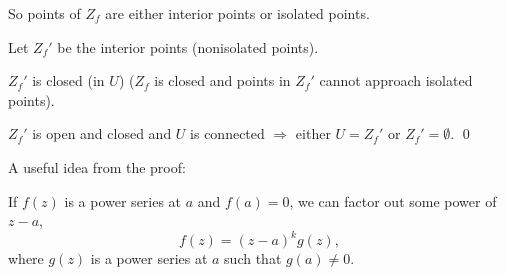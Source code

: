 \documentclass[10pt,aspectratio=169]{beamer}
\begin{document}
\begin{frame}

So points of $Z_f$ are either interior points or isolated points.

\medskip
\pause

Let $Z_f'$ be the interior points (nonisolated points).

\medskip
\pause

$Z_f'$ is closed (in $U$) ($Z_f$ is closed
and points in $Z_f'$ cannot approach isolated points).

\medskip
\pause

$Z_f'$ is open and closed and $U$ is connected $\Rightarrow$ either $U=Z_f'$ or $Z_f' = \emptyset$.
\qed

\end{frame}

\begin{frame}
A useful idea from the proof:

\medskip
\pause

If $f(z)$ is a power series at $a$ and $f(a)=0$,
we can factor out some power of $z-a$,
\pause
\begin{equation*}
f(z) = {(z-a)}^k g(z) ,
\end{equation*}
where $g(z)$ is a power series at $a$ such that $g(a) \not= 0$.
\end{frame}
\end{document}
